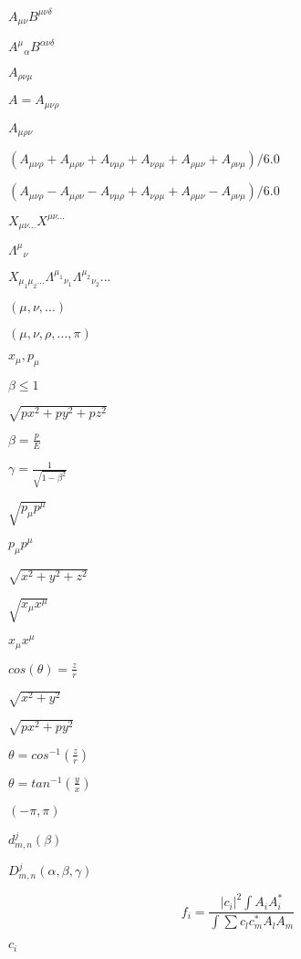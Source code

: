 \documentclass{article}
\begin{document}
$ A_{\mu\nu} B^{\mu\nu\delta} $
\pagebreak

$ A^{\mu}{}_{\alpha} B^{\alpha\nu\delta} $
\pagebreak

$ A_{\rho\nu\mu} $
\pagebreak

$ A = A_{\mu\nu\rho} $
\pagebreak

$ A_{\mu\rho\nu} $
\pagebreak

$ (A_{\mu\nu\rho} + A_{\mu\rho\nu} + A_{\nu\mu\rho} + A_{\nu\rho\mu} + A_{\rho\mu\nu} + A_{\rho\nu\mu})/6.0 $
\pagebreak

$ (A_{\mu\nu\rho} - A_{\mu\rho\nu} - A_{\nu\mu\rho} + A_{\nu\rho\mu} + A_{\rho\mu\nu} - A_{\rho\nu\mu})/6.0 $
\pagebreak

$ X_{\mu\nu...} X^{\mu\nu...} $
\pagebreak

$ \Lambda^{\mu}{}_{\nu}$
\pagebreak

$ X_{\mu_1 \mu_2 ...} \Lambda^{\mu_1}{}_{\nu_1} \Lambda^{\mu_2}{}_{\nu_2} ... $
\pagebreak

$(\mu,\nu,...)$
\pagebreak

$ (\mu,\nu,\rho,...,\pi) $
\pagebreak

$ x_{\mu}, p_{\mu} $
\pagebreak

$ \beta \leq 1 $
\pagebreak

$\sqrt{px^2 + py^2 + pz^2}$
\pagebreak

$ \beta = \frac{p}{E} $
\pagebreak

$ \gamma = \frac{1}{\sqrt{1 - \beta^2}} $
\pagebreak

$ \sqrt{p_{\mu} p^{\mu}} $
\pagebreak

$ p_{\mu} p^{\mu} $
\pagebreak

$\sqrt{x^2 + y^2 + z^2}$
\pagebreak

$ \sqrt{x_{\mu} x^{\mu}} $
\pagebreak

$ x_{\mu} x^{\mu} $
\pagebreak

$ cos(\theta) = \frac{z}{r} $
\pagebreak

$\sqrt{x^2 + y^2}$
\pagebreak

$\sqrt{px^2 + py^2}$
\pagebreak

$ \theta = cos^{-1}(\frac{z}{r}) $
\pagebreak

$ \theta = tan^{-1}(\frac{y}{x}) $
\pagebreak

$ (-\pi,\pi) $
\pagebreak

$d^{j}_{m,n}(\beta)$
\pagebreak

$D^{j}_{m,n}(\alpha,\beta,\gamma)$
\pagebreak

\[ f_i = \frac{|c_i|^2 \int A_i A_i^*}{\int \sum c_l c_m^* A_l A_m} \]
\pagebreak

$c_i$
\pagebreak
\end{document}

